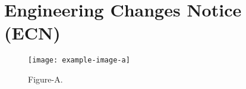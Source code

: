
\chapter{Engineering Changes Notice (ECN)}

\begin{figure}[!htp]
    \centering
    \texttt{[image: example-image-a]}
    \caption{Figure-A.}
    \label{fig:add}
\end{figure}
